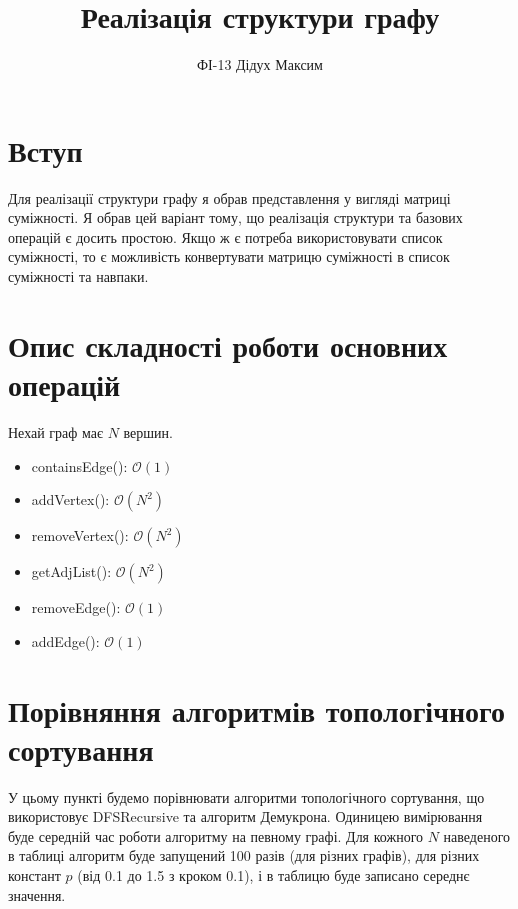 \documentclass{article}
\title{Реалізація структури графу}
\author{ФІ-13 Дідух Максим}
\begin{document}
\maketitle

\section{Вступ}
\quad Для реалізації структури графу я обрав представлення у вигляді матриці суміжності. Я обрав цей варіант тому, що реалізація структури та базових операцій є досить простою. Якщо ж є потреба використовувати список суміжності, то є можливість конвертувати матрицю суміжності в список суміжності та навпаки.

\section{Опис складності роботи основних операцій}
\quad Нехай граф має \(N\) вершин.

\begin{itemize}
    \item containsEdge(): \(\mathcal{O}(1)\)
    \item addVertex(): \(\mathcal{O}(N^2)\)
    \item removeVertex(): \(\mathcal{O}(N^2)\)
    \item getAdjList(): \(\mathcal{O}(N^2)\)
    \item removeEdge(): \(\mathcal{O}(1)\)
    \item addEdge(): \(\mathcal{O}(1)\)
\end{itemize}

\section{Порівняння алгоритмів топологічного сортування}
\quad У цьому пункті будемо порівнювати алгоритми топологічного сортування, що використовує DFSRecursive та алгоритм Демукрона. Одиницею вимірювання буде середній час роботи алгоритму на певному графі. Для кожного \(N\) наведеного в таблиці алгоритм буде запущений 100 разів (для різних графів), для різних констант \(p\) (від 0.1 до 1.5 з кроком 0.1), і в таблицю буде записано середнє значення.
\end{document}

